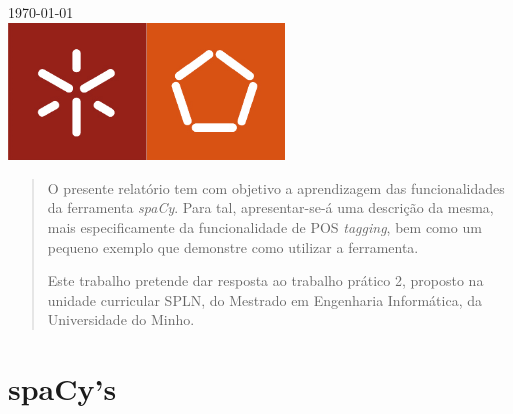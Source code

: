 \documentclass[12pt]{article}
\begin{document}
\begin{titlepage}
{\large \today}\\[1.5cm] %


\includegraphics[width=0.55\textwidth]{logo}\\[1cm] %
 

\vfill %

\end{titlepage}

\vspace{0.5cm}

\begin{abstract}
O presente relatório tem com objetivo a aprendizagem das funcionalidades da ferramenta \textit{spaCy}. Para tal, apresentar-se-á uma descrição da mesma, mais especificamente da
funcionalidade de POS \textit{tagging}, bem como um pequeno exemplo que demonstre como utilizar a ferramenta.

Este trabalho pretende dar resposta ao trabalho prático 2, proposto na unidade curricular SPLN, do Mestrado em Engenharia Informática, da Universidade do Minho.
\end{abstract}

\vspace{0.5cm}

\tableofcontents

\newpage

\let\oldref\ref
\renewcommand{\ref}[1]{\smash{\underline{\oldref{#1}}}}

\section{spaCy's}
\end{document}
